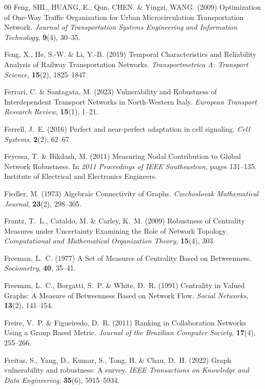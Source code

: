 \documentclass{comnet-mod}
\begin{document}
\begin{thebibliography}{00}
Feng, {\relax SHI}., HUANG, E., Qun, {\relax CHEN}. {\&} Yingzi, {\relax WANG}.
  (2009)  {Optimization of One-Way Traffic Organization for Urban
  Microcirculation Transportation Network}. {\em {Journal of Transportation
  Systems Engineering and Information Technology}}, \textbf{9}(4), 30--35.

Feng, X., He, S.-W. {\&} Li, Y.-B. (2019)  {Temporal Characteristics and
  Reliability Analysis of Railway Transportation Networks}. {\em
  {Transportmetrica A: Transport Science}}, \textbf{15}(2), 1825--1847.

Ferrari, C. {\&} Santagata, M. (2023)  {Vulnerability and Robustness of
  Interdependent Transport Networks in North-Western {{Italy}}}. {\em {European
  Transport Research Review}}, \textbf{15}(1), 1--21.

Ferrell, J.~E. (2016)  Perfect and near-perfect adaptation in cell signaling.
  {\em {Cell Systems}}, \textbf{2}(2), 62--67.

Feyessa, T. {\&} Bikdash, M. (2011)  {Measuring Nodal Contribution to Global
  Network Robustness}. In {\em {2011 Proceedings of {{IEEE}} Southeastcon}},
  pages 131--135. {Institute of Electrical and Electronics Engineers}.

Fiedler, M. (1973)  {Algebraic Connectivity of Graphs}. {\em {Czechoslovak
  Mathematical Journal}}, \textbf{23}(2), 298--305.

Frantz, T.~L., Cataldo, M. {\&} Carley, K.~M. (2009)  {Robustness of Centrality
  Measures under Uncertainty {{Examining}} the Role of Network Topology}. {\em
  {Computational and Mathematical Organization Theory}}, \textbf{15}(4), 303.

Freeman, L.~C. (1977)  {A Set of Measures of Centrality Based on Betweenness}.
  {\em {Sociometry}}, \textbf{40}, 35--41.

Freeman, L.~C., Borgatti, S.~P. {\&} White, D.~R. (1991)  {Centrality in Valued
  Graphs: {{A}} Measure of Betweenness Based on Network Flow}. {\em {Social
  Networks}}, \textbf{13}(2), 141--154.

Freire, V.~P. {\&} Figueiredo, D.~R. (2011)  {Ranking in Collaboration Networks
  Using a Group Based Metric}. {\em {Journal of the Brazilian Computer
  Society}}, \textbf{17}(4), 255--266.

Freitas, S., Yang, D., Kumar, S., Tong, H. {\&} Chau, D.~H. (2022)  {Graph
  vulnerability and robustness: A survey}. {\em {IEEE Transactions on Knowledge
  and Data Engineering}}, \textbf{35}(6), 5915--5934.


\end{thebibliography}
\end{document}
